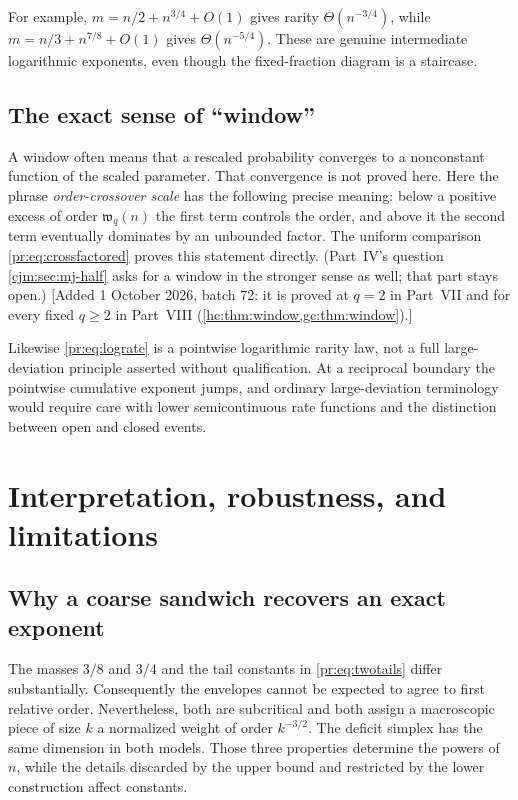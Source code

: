 \documentclass[11pt,a4paper]{article}
\theoremstyle{definition}\newaliascnt{definition}{theorem}
\theoremstyle{remark}\newaliascnt{remark}{theorem}
\begin{document}
For example, $m=n/2+n^{3/4}+O(1)$ gives rarity $\Theta(n^{-3/4})$, while
$m=n/3+n^{7/8}+O(1)$ gives $\Theta(n^{-5/4})$. These are genuine
intermediate logarithmic exponents, even though the fixed-fraction diagram is
a staircase.

\subsection{The exact sense of ``window''}
A window often means that a rescaled probability converges to a nonconstant
function of the scaled parameter. That convergence is not proved here. Here
the phrase \emph{order-crossover scale} has the following precise meaning:
below a positive excess of order $\mathfrak w_q(n)$ the first term controls
the order, and above it the second term eventually dominates by an unbounded
factor. The uniform comparison \eqref{pr:eq:crossfactored} proves this
statement directly. (Part~IV's question \cref{cjm:sec:mj-half} asks for a
window in the stronger sense as well; that part stays open.) [Added
1 October 2026, batch 72: it is proved at $q=2$ in Part~VII and for every
fixed $q\ge2$ in Part~VIII (\cref{hc:thm:window,gc:thm:window}).]

Likewise \eqref{pr:eq:lograte} is a pointwise logarithmic rarity law, not a
full large-deviation principle asserted without qualification. At a
reciprocal boundary the pointwise cumulative exponent jumps, and ordinary
large-deviation terminology would require care with lower semicontinuous
rate functions and the distinction between open and closed events.

\section{Interpretation, robustness, and limitations}
\label{pr:sec:interpretation}

\subsection{Why a coarse sandwich recovers an exact exponent}
The masses $3/8$ and $3/4$ and the tail constants in \eqref{pr:eq:twotails}
differ substantially. Consequently the envelopes cannot be expected to agree
to first relative order. Nevertheless, both are subcritical and both assign a
macroscopic piece of size $k$ a normalized weight of order $k^{-3/2}$. The
deficit simplex has the same dimension in both models. Those three
properties determine the powers of $n$, while the details discarded by the
upper bound and restricted by the lower construction affect constants.
\end{document}
